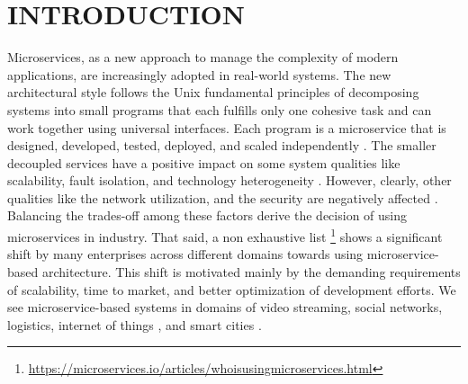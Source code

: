 \section{INTRODUCTION}

Microservices, as a new approach to manage the complexity of modern applications, are increasingly adopted in real-world systems. The new architectural style 
follows the Unix fundamental principles  of decomposing systems into small programs \cite{Unix ideas [115]:} that each fulfills only one cohesive task and can work together using universal interfaces. Each program is a microservice that is designed, developed, tested,  deployed, and scaled independently \cite{[Microservices. Martin Fowler(2015)]}. The smaller decoupled services have a positive impact on some system qualities like scalability, fault isolation, and technology heterogeneity \cite{}. However, clearly, other qualities like the network utilization, and the security are negatively affected \cite{ahmadvand2016requirements}.  Balancing the trades-off among these factors derive the decision of using microservices in industry. That said, a non exhaustive list \footnote{\url{https://microservices.io/articles/whoisusingmicroservices.html}} shows a significant shift by many enterprises across different domains towards using microservice-based architecture. This shift is  motivated mainly by the demanding requirements of scalability, time to market, and better optimization of development efforts. We see microservice-based systems in domains of video streaming, social networks, logistics, internet of things \cite{internet}, and smart cities \cite{smartcity}. 

